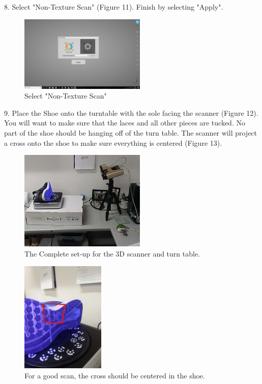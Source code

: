 8. Select "Non-Texture Scan" (Figure 11). Finish by selecting "Apply".

\begin{figure}[!htp]
\centering
\includegraphics[width=6cm]{Color}
\caption{Select "Non-Texture Scan"}
\label{Image 11}
\end{figure}

\newpage

9. Place the Shoe onto the turntable with the sole facing the scanner (Figure 12). You will want to make sure that the laces and all other pieces are tucked. No part of the shoe should be hanging off of the turn table. The scanner will project a cross onto the shoe to make sure everything is centered (Figure 13). 

\begin{figure}[!htp]
\centering
\includegraphics[width=6cm]{Full}
\caption{The Complete set-up for the 3D scanner and turn table.}
\label{Image 12}
\end{figure}

\begin{figure}[!htp]
\centering
\includegraphics[width=4cm]{Cross_on_Shoe_LI}
\caption{For a good scan, the cross should be centered in the shoe.}
\label{Image 13}
\end{figure}

